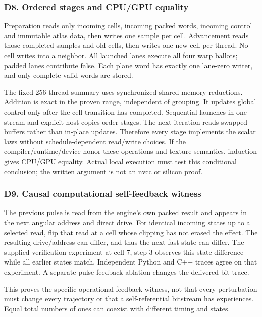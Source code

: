 \documentclass[11pt,a4paper]{article}
\begin{document}
\subsubsection{D8. Ordered stages and CPU/GPU equality}\label{d8.-ordered-stages-and-cpugpu-equality}

Preparation reads only incoming cells, incoming packed words, incoming control and immutable atlas data, then writes one sample per cell. Advancement reads those completed samples and old cells, then writes one new cell per thread. No cell writes into a neighbor. All launched lanes execute all four warp ballots; padded lanes contribute false. Each plane word has exactly one lane-zero writer, and only complete valid words are stored.

The fixed 256-thread summary uses synchronized shared-memory reductions. Addition is exact in the proven range, independent of grouping. It updates global control only after the cell transition has completed. Sequential launches in one stream and explicit host copies order stages. The next iteration reads swapped buffers rather than in-place updates. Therefore every stage implements the scalar laws without schedule-dependent read/write choices. If the compiler/runtime/device honor these operations and texture semantics, induction gives CPU/GPU equality. Actual local execution must test this conditional conclusion; the written argument is not an nvcc or silicon proof.

\subsubsection{D9. Causal computational self-feedback witness}\label{d9.-causal-computational-self-feedback-witness}

The previous pulse is read from the engine's own packed result and appears in the next angular address and direct drive. For identical incoming states up to a selected read, flip that read at a cell whose clipping has not erased the effect. The resulting drive/address can differ, and thus the next fast state can differ. The supplied verification experiment at cell 7, step 3 observes this state difference while all earlier states match. Independent Python and C++ traces agree on that experiment. A separate pulse-feedback ablation changes the delivered bit trace.

This proves the specific operational feedback witness, not that every perturbation must change every trajectory or that a self-referential bitstream has experiences. Equal total numbers of ones can coexist with different timing and states.
\end{document}
